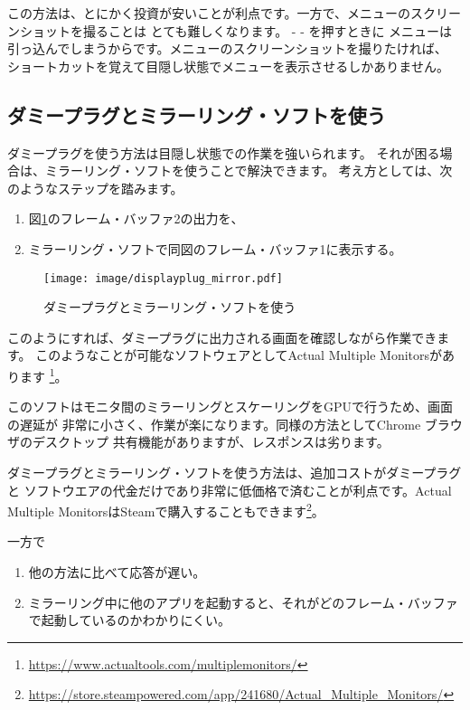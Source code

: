この方法は、とにかく投資が安いことが利点です。一方で、メニューのスクリーンショットを撮ることは
とても難しくなります。 -  - を押すときに
メニューは引っ込んでしまうからです。メニューのスクリーンショットを撮りたければ、
ショートカットを覚えて目隠し状態でメニューを表示させるしかありません。



\subsection{ダミープラグとミラーリング・ソフトを使う}
ダミープラグを使う方法は目隠し状態での作業を強いられます。
それが困る場合は、ミラーリング・ソフトを使うことで解決できます。
考え方としては、次のようなステップを踏みます。

\begin{enumerate}
  \item 図\ref{fig:display-plug-mirror}のフレーム・バッファ2の出力を、
  \item ミラーリング・ソフトで同図のフレーム・バッファ1に表示する。
\end{enumerate}

\begin{figure}[btp]
  \begin{center}
    \texttt{[image: image/displayplug\_mirror.pdf]}
    \caption{ダミープラグとミラーリング・ソフトを使う} \label{fig:display-plug-mirror}
  \end{center}
\end{figure}


このようにすれば、ダミープラグに出力される画面を確認しながら作業できます。
このようなことが可能なソフトウェアとしてActual Multiple Monitorsがあります
\footnote{\url{https://www.actualtools.com/multiplemonitors/}}。

このソフトはモニタ間のミラーリングとスケーリングをGPUで行うため、画面の遅延が
非常に小さく、作業が楽になります。同様の方法としてChrome ブラウザのデスクトップ
共有機能がありますが、レスポンスは劣ります。


ダミープラグとミラーリング・ソフトを使う方法は、追加コストがダミープラグと
ソフトウエアの代金だけであり非常に低価格で済むことが利点です。Actual
Multiple MonitorsはSteamで購入することもできます\footnote{\url{https://store.steampowered.com/app/241680/Actual_Multiple_Monitors/}}。


一方で

\begin{enumerate}
  \item 他の方法に比べて応答が遅い。
  \item ミラーリング中に他のアプリを起動すると、それがどのフレーム・バッファで起動しているのかわかりにくい。
\end{enumerate}

